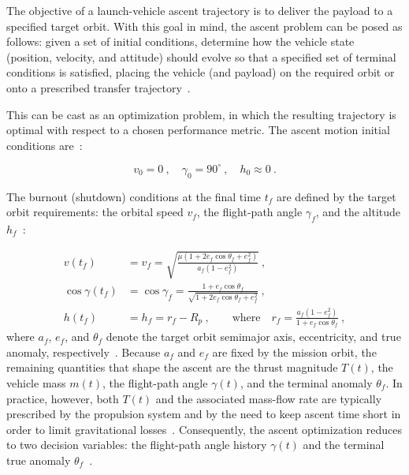 The objective of a launch-vehicle ascent trajectory is to deliver the payload to a specified target orbit. With this goal in mind, the ascent problem can be posed as follows: given a set of initial conditions, determine how the vehicle state (position, velocity, and attitude) should evolve so that a specified set of terminal conditions is satisfied, placing the vehicle (and payload) on the required orbit or onto a prescribed transfer trajectory~\cite{Edberg}.

This can be cast as an optimization problem, in which the resulting trajectory is optimal with respect to a chosen performance metric. The ascent motion initial conditions are~\cite{Ulrich}:

\begin{equation}
v_0 = 0 \ ,\quad \gamma_0 = 90^\circ \ ,\quad h_0 \approx 0 \ .
\label{eq:initial_conditions}
\end{equation}

The burnout (shutdown) conditions at the final time $t_f$ are defined by the target orbit requirements: the orbital speed $v_f$, the flight-path angle $\gamma_f$, and the altitude $h_f$~\cite{Edberg}:

\begin{equation}
\begin{aligned}
v(t_f) &= v_f = \sqrt{\frac{\mu\left(1+2e_f\cos\theta_f+e_f^2\right)}{a_f\left(1-e_f^2\right)}} \ ,\\
\cos\gamma(t_f) &= \cos\gamma_f = \frac{1+e_f\cos\theta_f}{\sqrt{1+2e_f\cos\theta_f+e_f^2}} \ ,\\
h(t_f) &= h_f = r_f - R_p \ ,\qquad \text{where}\quad r_f=\frac{a_f\left(1-e_f^2\right)}{1+e_f\cos\theta_f} \ ,
\end{aligned}
\end{equation}
where $a_f$, $e_f$, and $\theta_f$ denote the target orbit semimajor axis, eccentricity, and true anomaly, respectively~\cite{Edberg}. Because $a_f$ and $e_f$ are fixed by the mission orbit, the remaining quantities that shape the ascent are the thrust magnitude $T(t)$, the vehicle mass $m(t)$, the flight-path angle $\gamma(t)$, and the terminal anomaly $\theta_f$. In practice, however, both $T(t)$ and the associated mass-flow rate are typically prescribed by the propulsion system and by the need to keep ascent time short in order to limit gravitational losses~\cite{Ulrich}. Consequently, the ascent optimization reduces to two decision variables: the flight-path angle history $\gamma(t)$ and the terminal true anomaly $\theta_f$~\cite{Ulrich}.

